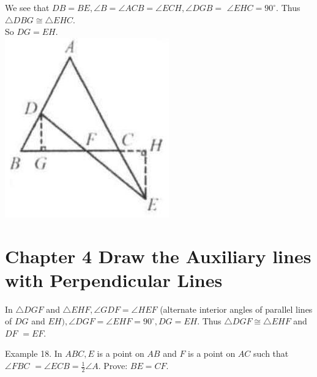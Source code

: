 \documentclass[10pt]{article}
\begin{document}
We see that \(D B=B E, \angle B=\angle A C B=\angle E C H, \angle D G B=\) \(\angle E H C=90^{\circ}\). Thus \(\triangle D B G \cong \triangle E H C\).\\
So \(D G=E H\).\\
\includegraphics[max width=\textwidth, center]{2025_04_17_97bc1f7e44d93c271a88g-084(1)}

\section*{Chapter 4 Draw the Auxiliary lines with Perpendicular Lines}
In \(\triangle D G F\) and \(\triangle E H F, \angle G D F=\angle H E F\) (alternate interior angles of parallel lines of \(D G\) and \(E H), \angle D G F=\angle E H F=90^{\circ}, D G=E H\). Thus \(\triangle D G F \cong \triangle E H F\) and \(D F\) \(=E F\).

Example 18. In \(A B C, E\) is a point on \(A B\) and \(F\) is a point on \(A C\) such that \(\angle F B C\) \(=\angle E C B=\frac{1}{2} \angle A\). Prove: \(B E=C F\).
\end{document}
